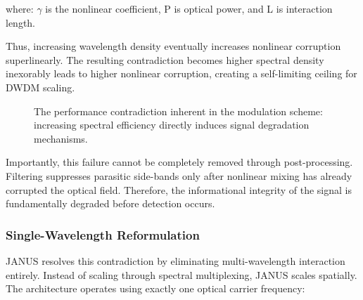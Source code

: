 \documentclass[journal]{IEEEtran}
\begin{document}
where: $\gamma$ is the nonlinear coefficient, P is optical power, and L is interaction length.

Thus, increasing wavelength density eventually increases nonlinear corruption superlinearly. The resulting contradiction becomes higher spectral density inexorably leads to higher nonlinear corruption, creating a self-limiting ceiling for DWDM scaling.

\begin{figure}[htbp]
\centering
{}
\caption{The performance contradiction inherent in the modulation scheme: increasing spectral efficiency directly induces signal degradation mechanisms.}
\label{fig:modulation_contradiction}
\end{figure}

Importantly, this failure cannot be completely removed through post-processing. Filtering suppresses parasitic side-bands only after nonlinear mixing has already corrupted the optical field. Therefore, the informational integrity of the signal is fundamentally degraded before detection occurs.

\subsubsection{\textbf{Single-Wavelength Reformulation}}

JANUS resolves this contradiction by eliminating multi-wavelength interaction entirely. Instead of scaling through spectral multiplexing, JANUS scales spatially. The architecture operates using exactly one optical carrier frequency:
\end{document}
